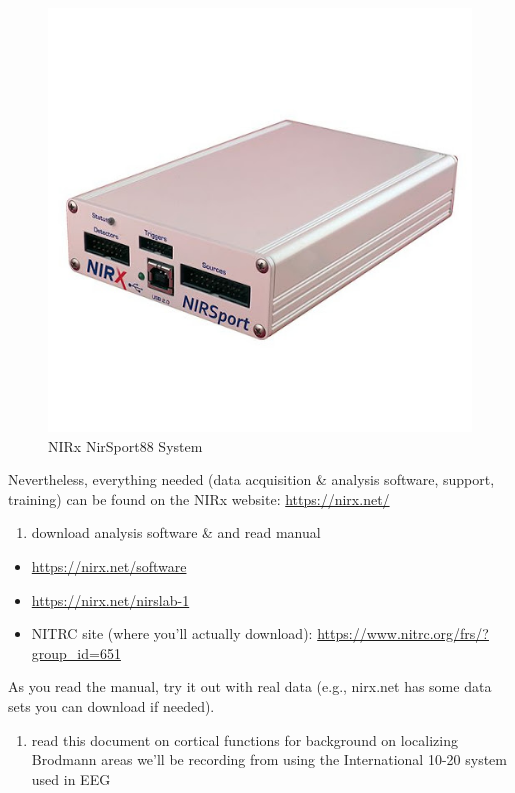 \documentclass[
]{book}
\providecommand{\tightlist}{%
  \setlength{\itemsep}{0pt}\setlength{\parskip}{0pt}}
\begin{document}
\begin{figure}
\centering
\includegraphics{docs/resources/nirsport88.jpg}
\caption{NIRx NirSport88 System}
\end{figure}

Nevertheless, everything needed (data acquisition \& analysis software, support, training) can be found on the NIRx website:
\url{https://nirx.net/}

\begin{enumerate}
\def\labelenumi{\arabic{enumi}.}
\tightlist
\item
  download analysis software \& and read manual
\end{enumerate}

\begin{itemize}
\tightlist
\item
  \url{https://nirx.net/software}
\item
  \url{https://nirx.net/nirslab-1}
\item
  NITRC site (where you'll actually download): \url{https://www.nitrc.org/frs/?group_id=651}
\end{itemize}

As you read the manual, try it out with real data (e.g., nirx.net has some data sets you can download if needed).

\begin{enumerate}
\def\labelenumi{\arabic{enumi}.}
\setcounter{enumi}{1}
\tightlist
\item
  read this document on cortical functions for background on localizing Brodmann areas we'll be recording from using the International 10-20 system used in EEG
\end{enumerate}
\end{document}

